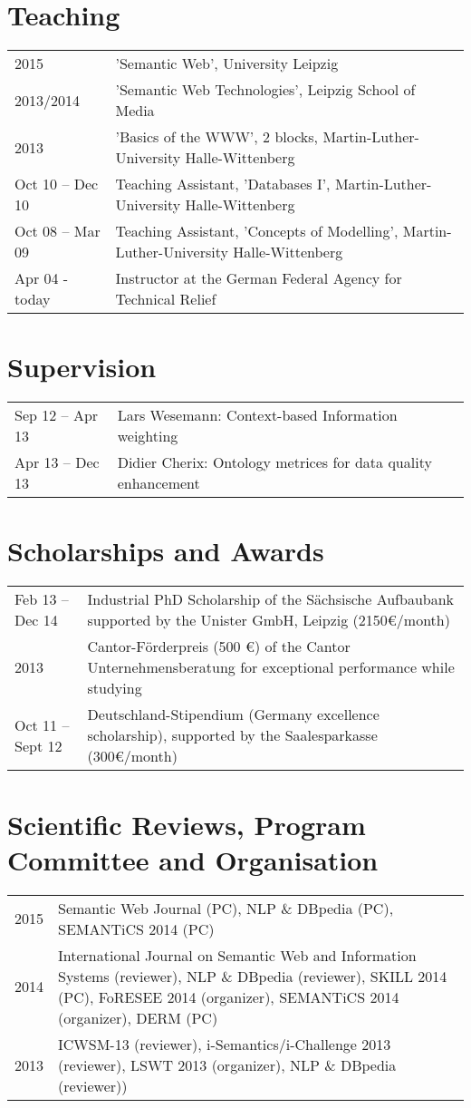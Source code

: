 \section*{Teaching}
\begin{tabular}{p{3cm}p{10cm}}	
2015		    & 'Semantic Web', University Leipzig\\
2013/2014	    & 	'Semantic Web Technologies', Leipzig School of Media\\
2013		    & 'Basics of the WWW', 2 blocks, Martin-Luther-University Halle-Wittenberg\\
Oct 10 – Dec 10	& 	Teaching Assistant, 'Databases I', Martin-Luther-University Halle-Wittenberg\\
Oct 08 – Mar 09	& 	Teaching Assistant, 'Concepts of Modelling', Martin-Luther-University Halle-Wittenberg\\
Apr 04 - today	& Instructor at the German Federal Agency for Technical Relief\\
\end{tabular}

\section*{Supervision}
\begin{tabular}{p{3cm}p{10cm}}	
Sep 12 – Apr 13 	& 	Lars Wesemann: Context-based Information weighting\\
Apr 13 – Dec 13 	& 	Didier Cherix: Ontology metrices for data quality enhancement
\end{tabular}

\section*{Scholarships and Awards}
\begin{tabular}{p{3cm}p{10cm}}	
Feb 13 – Dec 14 	& 	Industrial PhD Scholarship of the Sächsische Aufbaubank supported by the Unister GmbH, Leipzig (2150€/month)\\
2013	        	&   Cantor-Förderpreis (500 €) of the Cantor Unternehmensberatung for exceptional performance while studying\\
Oct 11 – Sept 12 	& 	Deutschland-Stipendium (Germany excellence scholarship), supported by the Saalesparkasse (300€/month)\\
\end{tabular}

\section*{Scientific Reviews, Program Committee and Organisation}
\begin{tabular}{p{3cm}p{10cm}}	
2015        & Semantic Web Journal (PC), NLP \& DBpedia (PC), SEMANTiCS 2014 (PC)\\
2014		& International Journal on Semantic Web and Information Systems (reviewer), NLP \& DBpedia (reviewer), SKILL 2014 (PC), FoRESEE 2014 (organizer), SEMANTiCS 2014 (organizer), DERM (PC)\\
2013		& ICWSM-13 (reviewer), i-Semantics/i-Challenge 2013 (reviewer), LSWT 2013 (organizer), NLP \& DBpedia (reviewer))\\
\end{tabular}

